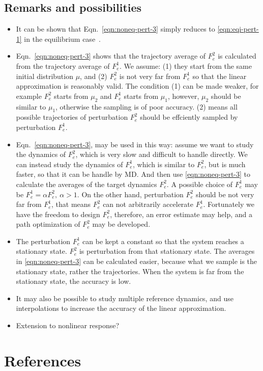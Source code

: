 \documentclass[aip,jcp,a4paper,reprint,onecolumn]{revtex4-1}
\newcommand{\bluec}[1]{{\color{blue} #1}}
\begin{document}
\subsection{Remarks and possibilities}
\bluec{
\begin{itemize}
\item It can be shown that 
  Eqn.~\eqref{eqn:noneq-pert-3} simply reduces to
  \eqref{eqn:eqi-pert-1}
  in the equilibrium case~\cite{baiesi2010nonequilibrium2}.
\item  Eqn.~\eqref{eqn:noneq-pert-3} shows that the trajectory average of
  $F_e^2$ is calculated from the trajectory average of $F_e^1$. We
  assume: (1) they start from the same initial distribution $\mu$, and
  (2) $F_e^2$ is not very far from $F_e^1$ so that the linear
  approximation is reasonably valid.  The condition (1) can be made
  weaker, for example $F_e^2$ starts from $\mu_2$ and $F_e^1$ starts
  from $\mu_1$, however, $\mu_2$ should be similar to $\mu_1$,
  otherwise the sampling is of poor accuracy.
  (2) means all possible trajectories of perturbation $F_e^2$ should be
  effciently sampled by perturbation $F_e^1$.
\item Eqn.~\eqref{eqn:noneq-pert-3}, may be used in this way:
  assume we want to study the dynamics of $F_e^2$, which is very slow
  and difficult to handle directly.
  We can instead study the dynamics of $F_e^1$, which is
  similar to $F_e^2$, but is much faster, so that it can be handle by MD.
  And then use \eqref{eqn:noneq-pert-3} to calculate the averages of
  the target dynamics $F_e^2$.
  A possible choice of  $F_e^1$ may be  $F_e^1 = \alpha F_e^2,\ \alpha > 1$.
  On the other hand, perturbation $F_e^2$ should be not very far
  from $F_e^1$, that means $F_e^2$ can not arbitrarily accelerate
  $F_e^1$. Fortunately we have the freedom to design $F_e^2$, therefore,
  an error estimate may help, and a path optimization of $F_e^2$
  may be developed.
\item The perturbation $F_e^1$ can be kept a constant so that the
  system reaches a stationary state.
  $F_e^2$ is perturbation from that stationary state.
  The averages in
  \eqref{eqn:noneq-pert-3} can be calculated easier, because
  what we sample is the stationary state, rather the trajectories.
  When the system is far from the stationary state, the
  accuracy is low. 
\item It may also be possible to study multiple reference dynamics,
  and use interpolations to increase the accuracy of the linear
  approximation.
\item Extension to nonlinear response?
\end{itemize}
}









\section*{References}
{}

\end{document}
